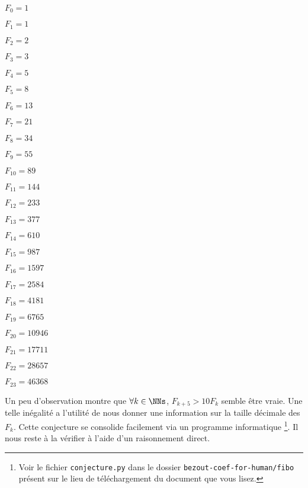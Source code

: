 \begin{multicols}{3}
    $F_{0} = 1$

    $F_{1} = 1$

    $F_{2} = 2$

    $F_{3} = 3$

    $F_{4} = 5$

    $F_{5} = 8$

    $F_{6} = 13$

    $F_{7} = 21$

    $F_{8} = 34$

    $F_{9} = 55$

    $F_{10} = 89$

    $F_{11} = 144$

    $F_{12} = 233$

    $F_{13} = 377$

    $F_{14} = 610$

    $F_{15} = 987$

    $F_{16} = 1597$

    $F_{17} = 2584$

    $F_{18} = 4181$

    $F_{19} = 6765$

    $F_{20} = 10946$

    $F_{21} = 17711$

    $F_{22} = 28657$

    $F_{23} = 46368$
\end{multicols}


Un peu d'observation montre que $\forall k \in \NNs$, $F_{k + 5} > 10 F_k$ semble être vraie. Une telle inégalité a l'utilité de nous donner une information sur la taille décimale des $F_k$.
Cette conjecture se consolide facilement via un programme informatique
\footnote{
	Voir le fichier \texttt{conjecture.py} dans le dossier \texttt{bezout-coef-for-human/fibo} présent sur le lieu de téléchargement du document que vous lisez.
}.
Il nous reste à la vérifier à l'aide d'un raisonnement direct.

